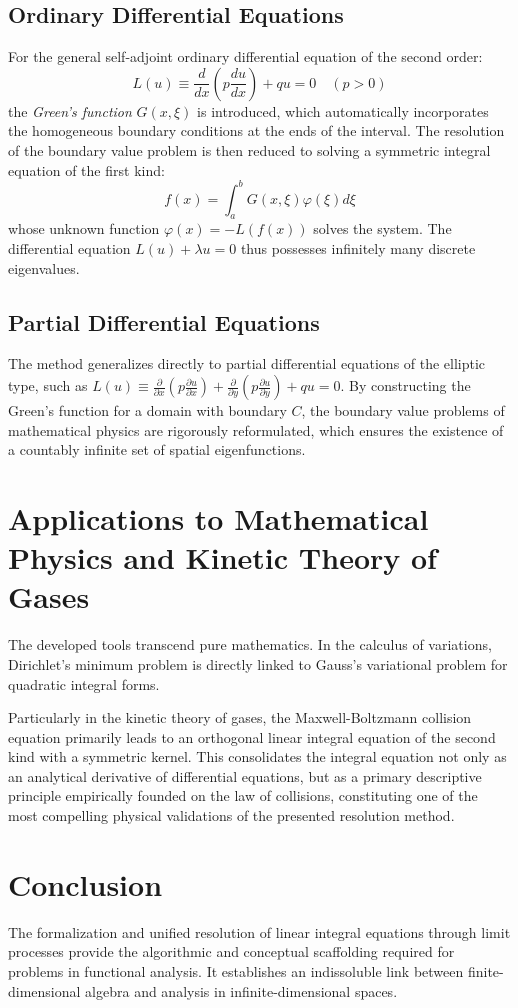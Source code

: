 \documentclass[11pt,a4paper]{article}
\begin{document}
\subsection{Ordinary Differential Equations}
For the general self-adjoint ordinary differential equation of the second order:
\begin{equation}
L(u) \equiv \frac{d}{dx}\left(p \frac{du}{dx}\right) + qu = 0 \quad (p > 0)
\end{equation}
the \textit{Green's function} $G(x,\xi)$ is introduced, which automatically incorporates the homogeneous boundary conditions at the ends of the interval. The resolution of the boundary value problem is then reduced to solving a symmetric integral equation of the first kind:
\begin{equation}
f(x) = \int_{a}^{b} G(x,\xi)\varphi(\xi)d\xi
\end{equation}
whose unknown function $\varphi(x) = -L(f(x))$ solves the system. The differential equation $L(u) + \lambda u = 0$ thus possesses infinitely many discrete eigenvalues.

\subsection{Partial Differential Equations}
The method generalizes directly to partial differential equations of the elliptic type, such as $L(u) \equiv \frac{\partial}{\partial x}(p \frac{\partial u}{\partial x}) + \frac{\partial}{\partial y}(p \frac{\partial u}{\partial y}) + qu = 0$. By constructing the Green's function for a domain with boundary $C$, the boundary value problems of mathematical physics are rigorously reformulated, which ensures the existence of a countably infinite set of spatial eigenfunctions.

\section{Applications to Mathematical Physics and Kinetic Theory of Gases}
The developed tools transcend pure mathematics. In the calculus of variations, Dirichlet's minimum problem is directly linked to Gauss's variational problem for quadratic integral forms. 

Particularly in the kinetic theory of gases, the Maxwell-Boltzmann collision equation primarily leads to an orthogonal linear integral equation of the second kind with a symmetric kernel. This consolidates the integral equation not only as an analytical derivative of differential equations, but as a primary descriptive principle empirically founded on the law of collisions, constituting one of the most compelling physical validations of the presented resolution method.

\section{Conclusion}
The formalization and unified resolution of linear integral equations through limit processes provide the algorithmic and conceptual scaffolding required for problems in functional analysis. It establishes an indissoluble link between finite-dimensional algebra and analysis in infinite-dimensional spaces.
\end{document}
